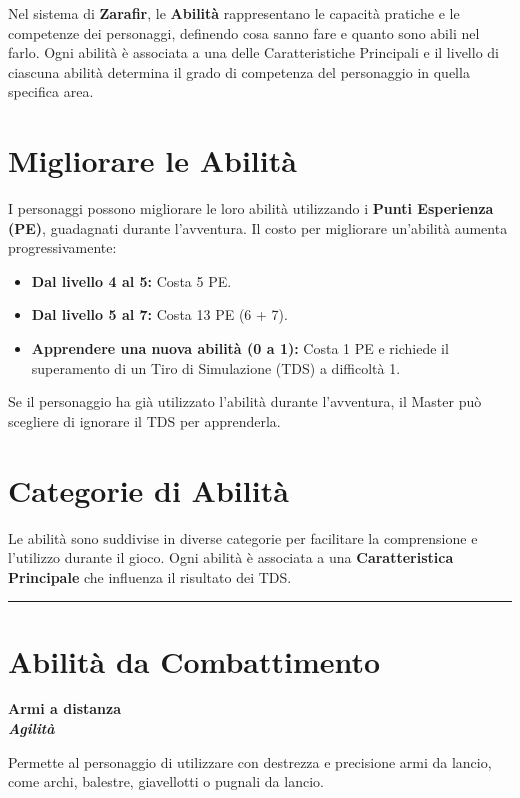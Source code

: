 \documentclass[../manuale_main.tex]{subfiles}
\begin{document}
Nel sistema di \textbf{Zarafir}, le \textbf{Abilità} rappresentano le capacità pratiche e le competenze dei personaggi, definendo cosa sanno fare e quanto sono abili nel farlo. Ogni abilità è associata a una delle Caratteristiche Principali e il livello di ciascuna abilità determina il grado di competenza del personaggio in quella specifica area.

\vspace{0.3cm}

\section{Migliorare le Abilità}
I personaggi possono migliorare le loro abilità utilizzando i \textbf{Punti Esperienza (PE)}, guadagnati durante l’avventura. Il costo per migliorare un’abilità aumenta progressivamente:

\begin{itemize}
    \item \textbf{Dal livello 4 al 5:} Costa 5 PE.
    \item \textbf{Dal livello 5 al 7:} Costa 13 PE (6 + 7).
    \item \textbf{Apprendere una nuova abilità (0 a 1):} Costa 1 PE e richiede il superamento di un Tiro di Simulazione (TDS) a difficoltà 1.
\end{itemize}

Se il personaggio ha già utilizzato l’abilità durante l’avventura, il Master può scegliere di ignorare il TDS per apprenderla.

\vspace{0.3cm}

\section{Categorie di Abilità}
Le abilità sono suddivise in diverse categorie per facilitare la comprensione e l’utilizzo durante il gioco. Ogni abilità è associata a una \textbf{Caratteristica Principale} che influenza il risultato dei TDS.

\vspace{0.5cm}
\rule{\textwidth}{0.4pt}
\vspace{0.5cm}

\section{Abilità da Combattimento}

\begin{center}
\textbf{\large{Armi a distanza}}\\ \textit{\textbf{Agilità}}\\
\end{center}
Permette al personaggio di utilizzare con destrezza e precisione armi da lancio, come archi, balestre, giavellotti o pugnali da lancio.
\end{document}
